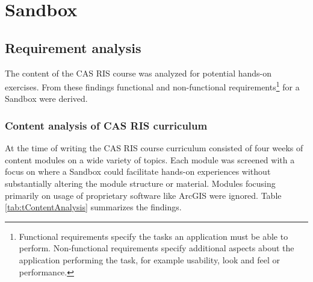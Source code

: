 \documentclass[11pt, a4paper, oneside, parskip=full-]{scrartcl}
\begin{document}
\section{Sandbox}

\subsection{Requirement analysis} \label{sectionrequirements}

The content of the CAS RIS course was analyzed for potential hands-on exercises.
From these findings functional and non-functional
requirements\footnote{Functional requirements specify the tasks an application
must be able to perform. Non-functional requirements specify additional aspects
about the application performing the task, for example usability, look and feel
or performance. } for a Sandbox were derived.

\subsubsection{Content analysis of CAS RIS curriculum}
At the time of writing the CAS RIS course curriculum consisted of four weeks of
content modules on a wide variety of topics. Each module was screened with a
focus on where a Sandbox could facilitate hands-on experiences without
substantially altering the module structure or material. Modules focusing
primarily on usage of proprietary software like ArcGIS were ignored. Table
\ref{tab:tContentAnalysis} summarizes the findings.
\end{document}
